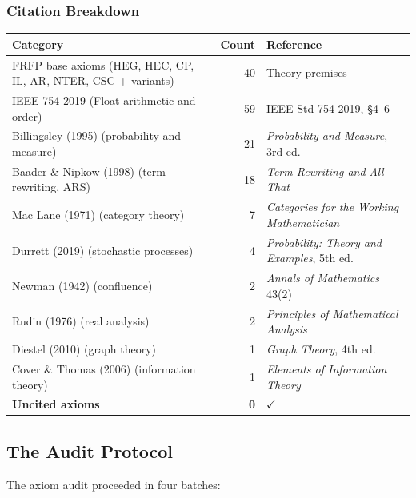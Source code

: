 \subsubsection*{Citation Breakdown}

\begin{center}
\begin{tabular}{p{7.5cm}rl}
\toprule
Category & Count & Reference \\
\midrule
FRFP base axioms (HEG, HEC, CP, IL, AR, NTER, CSC + variants) & 40 & Theory premises \\
IEEE 754-2019 (Float arithmetic and order) & 59 & IEEE Std 754-2019, \S4--6 \\
Billingsley (1995) (probability and measure) & 21 & \textit{Probability and Measure}, 3rd ed. \\
Baader \& Nipkow (1998) (term rewriting, ARS) & 18 & \textit{Term Rewriting and All That} \\
Mac Lane (1971) (category theory) & 7 & \textit{Categories for the Working Mathematician} \\
Durrett (2019) (stochastic processes) & 4 & \textit{Probability: Theory and Examples}, 5th ed. \\
Newman (1942) (confluence) & 2 & \textit{Annals of Mathematics} 43(2) \\
Rudin (1976) (real analysis) & 2 & \textit{Principles of Mathematical Analysis} \\
Diestel (2010) (graph theory) & 1 & \textit{Graph Theory}, 4th ed. \\
Cover \& Thomas (2006) (information theory) & 1 & \textit{Elements of Information Theory} \\
\textbf{Uncited axioms} & \textbf{0} & $\checkmark$ \\
\bottomrule
\end{tabular}
\end{center}

\subsection{The Audit Protocol}

The axiom audit proceeded in four batches:

